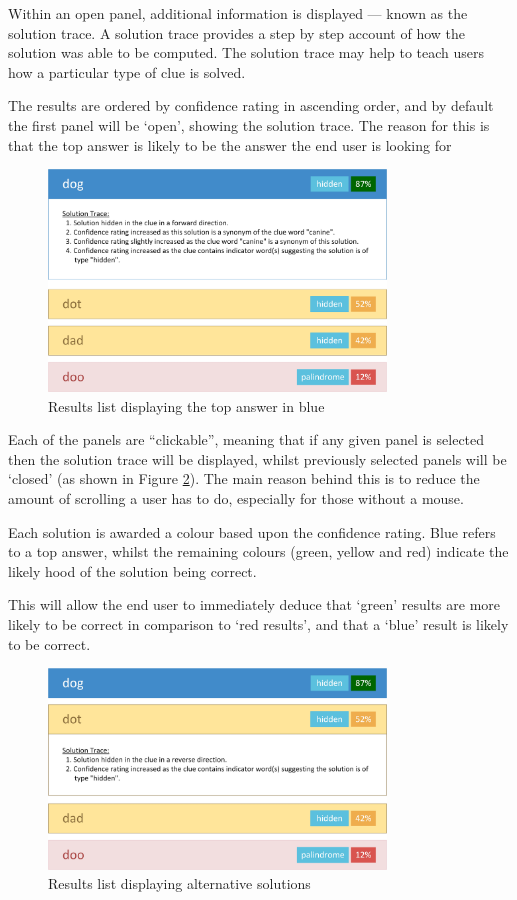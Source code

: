 Within an open panel, additional information is displayed --- known as the 
solution trace. A solution trace provides a step by step account of how the 
solution was able to be computed. The solution trace may help to teach users how
a particular type of clue is solved.

The results are ordered by confidence rating in ascending order, and by default 
the first panel will be `open', showing the solution trace. The reason for this
is that the top answer is likely to be the answer the end user is looking for

\begin{figure}[H]
  \centering
  \includegraphics[width=0.8\textwidth]{ui/results_primary.jpg}
  \caption{Results list displaying the top answer in blue}
  \label{fig:results_primary}
\end{figure}

Each of the panels are ``clickable'', meaning that if any given panel is 
selected then the solution trace will be displayed, whilst previously selected 
panels will be `closed' (as shown in Figure \ref{fig:results_secondary}). The 
main reason behind this is to reduce the amount of scrolling a user has to do, 
especially for those without a mouse.

Each solution is awarded a colour based upon the confidence rating. Blue refers 
to a top answer, whilst the remaining colours (green, yellow and red) indicate 
the likely hood of the solution being correct. 

This will allow the end user to immediately deduce that `green' results are 
more likely to be correct in comparison to `red results', and that a `blue' 
result is likely to be correct.

\begin{figure}[H]
  \centering
  \includegraphics[width=0.8\textwidth]{ui/results_secondary.jpg}
  \caption{Results list displaying alternative solutions}
  \label{fig:results_secondary}
\end{figure}
